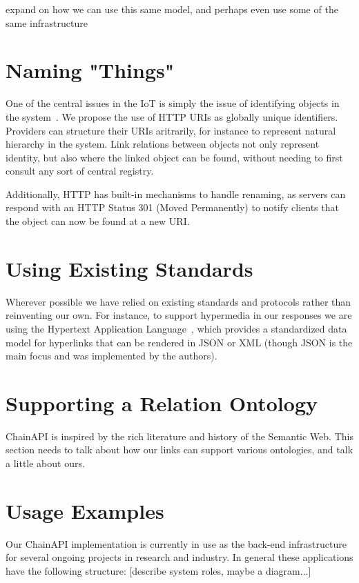 \documentclass{acm_proc_article-sp}
\begin{document}
expand on how we can use this same model, and perhaps even use some of the
same infrastructure

\section{Naming "Things"}

One of the central issues in the IoT is simply the issue of identifying objects
in the system~\cite{iotsurvey}. We propose the use of HTTP URIs as globally
unique identifiers.  Providers can structure their URIs aritrarily, for
instance to represent natural hierarchy in the system. Link relations between
objects not only represent identity, but also where the linked object can be
found, without needing to first consult any sort of central registry.

Additionally, HTTP has built-in mechanisms to handle renaming, as servers can
respond with an HTTP Status 301 (Moved Permanently) to notify clients that the
object can now be found at a new URI.

\section{Using Existing Standards}

Wherever possible we have relied on existing standards and protocols rather
than reinventing our own. For instance, to support hypermedia in our responses
we are using the Hypertext Application Language~\cite{json-hal-draft}, which
provides a standardized data model for hyperlinks that can be rendered in JSON
or XML (though JSON is the main focus and was implemented by the authors).

\section{Supporting a Relation Ontology}

ChainAPI is inspired by the rich literature and history of the Semantic Web.
This section needs to talk about how our links can support various ontologies,
and talk a little about ours.

\section{Usage Examples}

Our ChainAPI implementation is currently in use as the back-end infrastructure
for several ongoing projects in research and industry. In general these applications
have the following structure: [describe system roles, maybe a diagram...]
\end{document}

